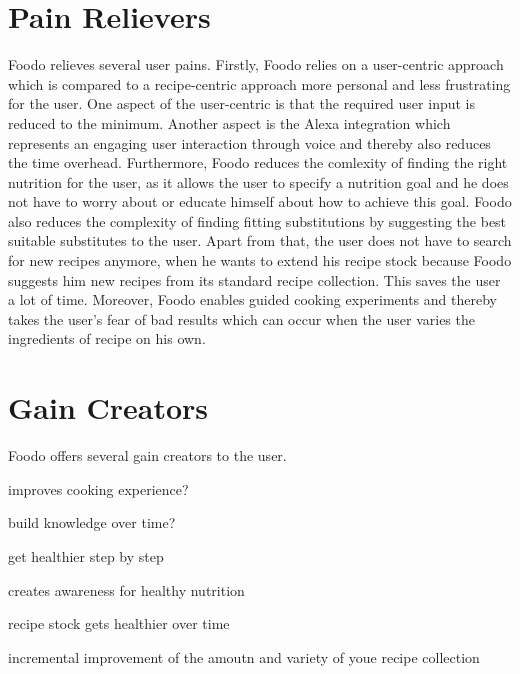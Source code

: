 \section{Pain Relievers}
Foodo relieves several user pains. Firstly, Foodo relies on a user-centric approach which is compared to a recipe-centric approach more personal and less frustrating for the user. One aspect of the user-centric is that the required user input is reduced to the minimum. Another aspect is the Alexa integration which represents an engaging user interaction through voice and thereby also reduces the time overhead. Furthermore, Foodo reduces the comlexity of finding the right nutrition for the user, as it allows the user to specify a nutrition goal and he does not have to worry about or educate himself about how to achieve this  goal. Foodo also reduces the complexity of finding fitting substitutions by suggesting the best suitable substitutes to the user. Apart from that, the user does not have to search for new recipes anymore, when he wants to extend his recipe stock because Foodo suggests him new recipes from its standard recipe collection. This saves the user a lot of time. Moreover, Foodo enables guided cooking experiments and thereby takes the user's fear of bad results which can occur when the user varies the ingredients of recipe on his own.


\section{Gain Creators}
Foodo offers several gain creators to the user. 

improves cooking experience?

build knowledge over time?

get healthier step by step

creates awareness for healthy nutrition

recipe stock gets healthier over time

incremental improvement of the amoutn and variety of youe recipe collection




